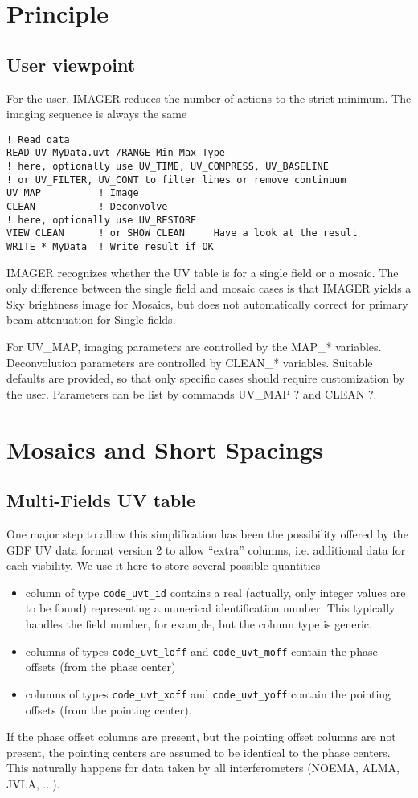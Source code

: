 \documentclass[11pt]{article}
\begin{document}
\section{Principle}

\subsection{User viewpoint}
For the user, IMAGER reduces the number of actions to the strict minimum.
The imaging sequence is always the same
\begin{verbatim}
! Read data
READ UV MyData.uvt /RANGE Min Max Type
! here, optionally use UV_TIME, UV_COMPRESS, UV_BASELINE
! or UV_FILTER, UV_CONT to filter lines or remove continuum
UV_MAP          ! Image
CLEAN           ! Deconvolve
! here, optionally use UV_RESTORE
VIEW CLEAN      ! or SHOW CLEAN     Have a look at the result
WRITE * MyData  ! Write result if OK
\end{verbatim}
IMAGER recognizes whether the UV table is for a single field or a 
mosaic. The only difference between the single field and mosaic cases 
is that IMAGER yields a Sky brightness image for Mosaics, but does not 
automatically correct for primary beam attenuation for Single fields.

For UV\_MAP, imaging parameters are controlled by the MAP\_* variables. 
Deconvolution parameters are controlled by CLEAN\_* variables.
Suitable defaults are provided, so that only specific cases should
require customization by the user.  Parameters can be list by
commands UV\_MAP ?  and CLEAN ?.



\section{Mosaics and Short Spacings}

\subsection{Multi-Fields UV table}
One major step to allow this simplification has been the possibility offered by
the GDF UV data format version 2 to allow ``extra'' columns, i.e. additional data for
each visbility. We use it here to store several possible quantities
\begin{itemize}
\item  column of type \texttt{code\_uvt\_id} contains a real (actually, only
integer values are to be found) representing a numerical identification number. This
typically handles the field number, for example, but the column type is generic.
\item  columns of types \texttt{code\_uvt\_loff} and \texttt{code\_uvt\_moff}
contain the phase offsets (from the phase center)
\item  columns of types \texttt{code\_uvt\_xoff} and \texttt{code\_uvt\_yoff}
contain the pointing offsets (from the pointing center).
\end{itemize}
If the phase offset columns are present, but the pointing offset columns
are not present, the pointing centers are assumed to be identical to the 
phase centers. This naturally happens for data taken by all interferometers 
(NOEMA, ALMA, JVLA, ...).
\end{document}
